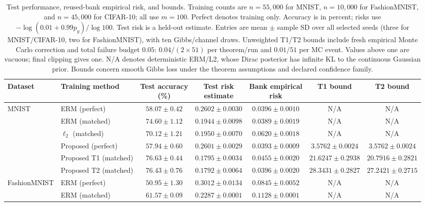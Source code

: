 \begin{table}[t]
\centering\footnotesize
\caption{Test performance, reused-bank empirical risk, and bounds. Training counts are $n=55{,}000$ for MNIST, $n=10{,}000$ for FashionMNIST, and $n=45{,}000$ for CIFAR-10; all use $m=100$. Perfect denotes training only. Accuracy is in percent; risks use $-\log(0.01+0.99p_y)/\log100$. Test risk is a held-out estimate. Entries are mean $\pm$ sample SD over all selected seeds (three for MNIST/CIFAR-10, two for FashionMNIST), with ten Gibbs/channel draws. Unweighted T1/T2 bounds include fresh empirical Monte Carlo correction and total failure budget $0.05$: $0.04/(2\times51)$ per theorem/run and $0.01/51$ per MC event. Values above one are vacuous; final clipping gives one. N/A denotes deterministic ERM/L2, whose Dirac posterior has infinite KL to the continuous Gaussian prior. Bounds concern smooth Gibbs loss under the theorem assumptions and declared confidence family.}
\label{tab:sim_algorithm_risk_bounds}
\label{tab:sim_accuracy_risk}
\label{tab:sim_cifar}
\setlength{\tabcolsep}{4pt}
\begin{tabular}{llccccc}
\toprule
Dataset & Training method & \shortstack{Test accuracy\\(\%)} & \shortstack{Test risk\\estimate} & \shortstack{Bank empirical\\risk} & T1 bound & T2 bound\\
\midrule
MNIST & ERM (perfect) & $58.07\pm0.42$ & $0.2602\pm0.0030$ & $0.0396\pm0.0010$ & N/A & N/A\\
 & ERM (matched) & $74.60\pm1.12$ & $0.1944\pm0.0098$ & $0.0389\pm0.0019$ & N/A & N/A\\
 & $\ell_2$ (matched) & $70.12\pm1.21$ & $0.1950\pm0.0070$ & $0.0620\pm0.0018$ & N/A & N/A\\
 & Proposed (perfect) & $57.94\pm0.60$ & $0.2601\pm0.0029$ & $0.0393\pm0.0009$ & $3.5762\pm0.0024$ & $3.5762\pm0.0024$\\
 & Proposed T1 (matched) & $76.63\pm0.44$ & $0.1795\pm0.0034$ & $0.0455\pm0.0020$ & $21.6247\pm0.2938$ & $20.7916\pm0.2821$\\
 & Proposed T2 (matched) & $76.43\pm0.76$ & $0.1792\pm0.0064$ & $0.0396\pm0.0020$ & $28.3431\pm0.2827$ & $27.2421\pm0.2715$\\
\addlinespace
FashionMNIST & ERM (perfect) & $50.95\pm1.30$ & $0.3012\pm0.0134$ & $0.0845\pm0.0052$ & N/A & N/A\\
 & ERM (matched) & $61.57\pm0.09$ & $0.2287\pm0.0001$ & $0.1128\pm0.0001$ & N/A & N/A\\

\end{tabular}
\end{table}
